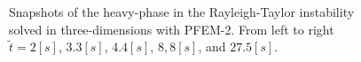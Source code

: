 \begin{figure}[htbp]
\begin{center}
{    }
  \end{center}
  \caption{\label{fg:rayleigh-3d} Snapshots of the heavy-phase in the Rayleigh-Taylor instability solved in three-dimensions with PFEM-2. %
  From left to right $\widetilde{t} =2[s]$, $3.3[s]$, $4.4[s]$, $8,8[s]$, and $27.5[s]$.}
\end{figure}

\afterpage{\clearpage}
